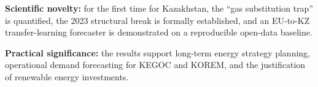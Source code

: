 \textbf{Scientific novelty:} for the first time for Kazakhstan, the ``gas substitution trap'' is quantified, the 2023 structural break is formally established, and an EU-to-KZ transfer-learning forecaster is demonstrated on a reproducible open-data baseline.

\textbf{Practical significance:} the results support long-term energy strategy planning, operational demand forecasting for KEGOC and KOREM, and the justification of renewable energy investments.

\endgroup
